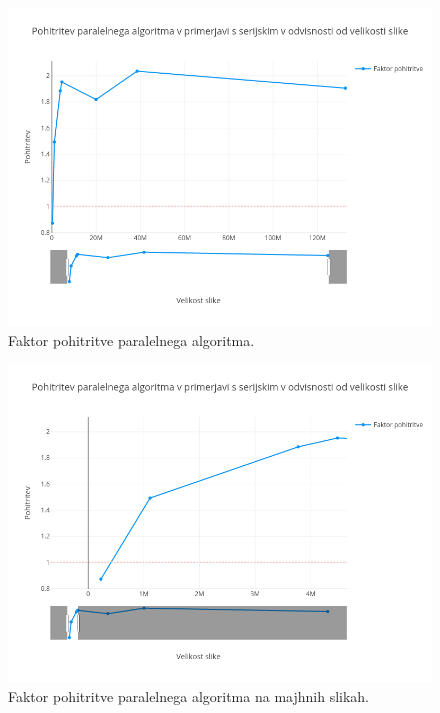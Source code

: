 \documentclass[11pt,a4paper]{article}
\begin{document}
\begin{figure}[htbp]
\begin{center}
\includegraphics[width=1.2\textwidth]{plot1.png}
\end{center}
\caption{Faktor pohitritve paralelnega algoritma.}
\label{pic1}
\end{figure}

\begin{figure}[htbp]
\begin{center}
\includegraphics[width=1.2\textwidth]{plot2.png}
\end{center}
\caption{Faktor pohitritve paralelnega algoritma na majhnih slikah.}
\label{pic2}
\end{figure}
\end{document}
